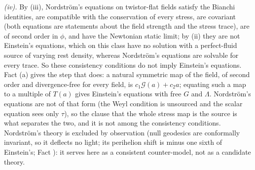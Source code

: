 \emph{(iv).} By (iii), Nordstr\"om's equations on twistor-flat fields satisfy the Bianchi identities, are compatible with the conservation of every stress, are covariant (both equations are statements about the field strength and the stress trace), are of second order in $\phi$, and have the Newtonian static limit; by (ii) they are not Einstein's equations, which on this class have no solution with a perfect-fluid source of varying rest density, whereas Nordstr\"om's equations are solvable for every trace. So these consistency conditions do not imply Einstein's equations. Fact (a) gives the step that does: a natural symmetric map of the field, of second order and divergence-free for every field, is $c_{1}\mathcal{G}(a) + c_{2}a$; equating such a map to a multiple of $T(a)$ gives Einstein's equations with free $G$ and $\Lambda$. Nordstr\"om's equations are not of that form (the Weyl condition is unsourced and the scalar equation sees only $\tau$), so the clause that the whole stress map is the source is what separates the two, and it is not among the consistency conditions. Nordstr\"om's theory is excluded by observation (null geodesics are conformally invariant, so it deflects no light; its perihelion shift is minus one sixth of Einstein's; Fact ): it serves here as a consistent counter-model, not as a candidate theory.
